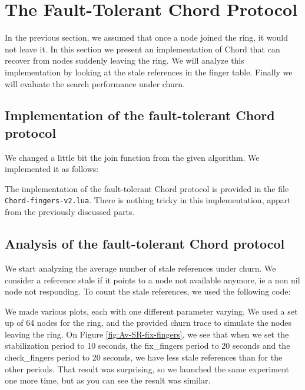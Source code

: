 \documentclass[a4paper, 11pt]{article}
\theoremstyle{plain}
\theoremstyle{definition}
\begin{document}
\section{The Fault-Tolerant Chord Protocol}
\label{sec:fault-tolerant-chord}

  In the previous section, we assumed that once a node joined the ring, it would not leave it. In this section
  we present an implementation of Chord that can recover from nodes suddenly leaving the ring. We will analyze
  this implementation by looking at the stale references in the finger table. Finally we will evaluate the
  search performance under churn.

  \subsection{Implementation of the fault-tolerant Chord protocol}
  \label{sec:impl-ft-chord}
  
    We changed a little bit the join function from the given algorithm. We implemented it as follows:

    

    The implementation of the fault-tolerant Chord protocol is provided in the file
    \texttt{Chord-fingers-v2.lua}. There is nothing tricky in this implementation, appart from the previously
    discussed parts. 
    
    
  \subsection{Analysis of the fault-tolerant Chord protocol}
  \label{sec:eval-ft-chord}

    We start analyzing the average number of stale references under churn. We consider a reference stale if it
    points to a node not available anymore, ie a non nil node not responding. To count the stale references,
    we used the following code:

    
    
    We made various plots, each with
    one different parameter varying. We used a set up of 64 nodes for the ring, and the provided churn trace
    to simulate the nodes leaving the ring. On Figure \ref{fig:Av-SR-fix-fingers}, we see that when we set the
    stabilization period to 10 seconds, the fix\_fingers period to 20 seconds and the check\_fingers period to
    20 seconds, we have less stale references than for the other periods. That result was surprising, so we
    launched the same experiment one more time, but as you can see the result was similar.
\end{document}
